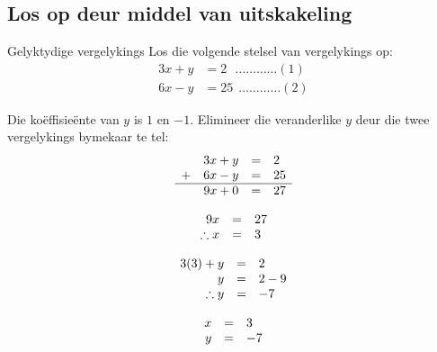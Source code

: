 \subsection*{Los op deur middel van uitskakeling}

\begin{wex}
{Gelyktydige vergelykings}
{
Los die volgende stelsel van vergelykings op:
\begin{align*}
  3x+y &= 2  ~~~\ldots \ldots \ldots \ldots (1)\\
  6x-y &= 25 ~~\ldots \ldots \ldots \ldots (2)
\end{align*}
}
{
Die ko\"effisie\"ente van $y$ is $1$ en $-1$. Elimineer die veranderlike $y$ deur die twee vergelykings bymekaar te tel:
\begin{equation*}
\begin{array}{ccll}\hfill & 3x+y& =& 2\hfill \\ 
\hfill+ & 6x-y& =& 25\hfill \\ \hline
 \hfill & 9x + 0 &=& 27
\end{array}
\end{equation*}


\begin{equation*}
    \begin{array}{ccl}\hfill 9x& =& 27\hfill \\
	\hfill \therefore x  & =& 3\hfill 
    \end{array}
\end{equation*}

\begin{equation*}
    \begin{array}{ccl}\hfill 3(3) + y &=& 2\\
	\hfill y & =& 2-9\\
	\hfill \therefore y & =& -7 
   \end{array}
\end{equation*}


\begin{equation*}
\begin{array}{ccc}
 \hfill x& =& 3\hfill \\
\hfill y& =& -7\hfill 
\end{array}
\end{equation*}
}
\end{wex}

